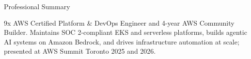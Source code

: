 \documentclass{resume}
\subtitle{Platform \& DevOps Engineer \textbar{} 9x AWS Certified \textbar{} AWS Community Builder}
\begin{document}

\begin{rSection}{Professional Summary}

9x AWS Certified Platform \& DevOps Engineer and 4-year AWS Community Builder. Maintains SOC 2-compliant EKS and serverless platforms, builds agentic AI systems on Amazon Bedrock, and drives infrastructure automation at scale; presented at AWS Summit Toronto 2025 and 2026.

\end{rSection}

\end{document}
